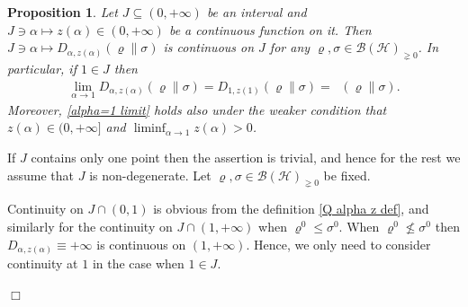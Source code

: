 \documentclass[unsortedaddress,superscriptaddress,pra,notitlepage]{revtex4}
\newtheorem{prop}[definition]{Proposition}
\newenvironment{proof}[1][Proof]{\begin{trivlist}
\item[\hskip \labelsep {\bfseries #1}]}{\hfill$\Box$\end{trivlist}}
\def\B{{\mathcal B}}
\def\rho{\varrho}
\def\hil{{\mathcal H}}
\def\pne{_{\gneq 0}}
\DeclareMathOperator{\DU}{\mathit{D}^{Um}}
\begin{document}
\begin{prop}\label{prop:a-z cont in a}
Let $J\subseteq(0,+\infty)$ be an interval and $J\ni\alpha\mapsto z(\alpha)\in(0,+\infty)$ be a continuous 
function on it. Then $J\ni\alpha\mapsto D_{\alpha,z(\alpha)}(\rho\|\sigma)$ is continuous on $J$ for any $\rho,\sigma\in\B(\hil)\pne$.
In particular, if $1\in J$ then
\begin{align}\label{alpha=1 limit}
\lim_{\alpha\to 1}D_{\alpha,z(\alpha)}(\rho\|\sigma)
=
D_{1,z(1)}(\rho\|\sigma)=
\DU(\rho\|\sigma).
\end{align}
Moreover, \eqref{alpha=1 limit} holds also under the weaker condition that 
$z(\alpha)\in(0,+\infty]$ and 
$\liminf_{\alpha\to 1}z(\alpha)>0$. 
\end{prop}
\begin{proof}
If $J$ contains only one point then the assertion is trivial, and hence for the rest we assume that $J$ is non-degenerate.
Let $\rho,\sigma\in\B(\hil)\pne$ be fixed.

Continuity on $J\cap(0,1)$ is obvious from the definition \eqref{Q alpha z def}, and similarly for the continuity on $J\cap(1,+\infty)$ when $\rho^0\le\sigma^0$. 
When $\rho^0\nleq\sigma^0$ then $D_{\alpha,z(\alpha)}\equiv +\infty$ is continuous on 
$(1,+\infty)$. Hence, we only need to consider continuity at $1$ in the case when $1\in J$. 


\end{proof}
\end{document}
